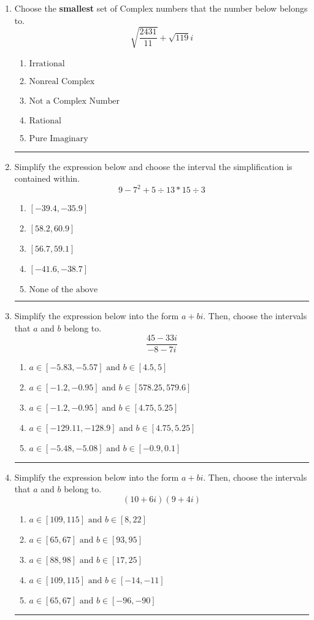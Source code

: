 \documentclass[14pt]{extbook}
\newcommand{\litem}[1]{\item#1\hspace*{-1cm}\rule{\textwidth}{0.4pt}}
\begin{document}
\begin{enumerate}
{\begin{enumerate}[label=\Alph*.]
\end{enumerate} }
\litem{
Choose the \textbf{smallest} set of Complex numbers that the number below belongs to.\[ \sqrt{\frac{2431}{11}}+\sqrt{119} i \]\begin{enumerate}[label=\Alph*.]
\item \( \text{Irrational} \)
\item \( \text{Nonreal Complex} \)
\item \( \text{Not a Complex Number} \)
\item \( \text{Rational} \)
\item \( \text{Pure Imaginary} \)

\end{enumerate} }
\litem{
Simplify the expression below and choose the interval the simplification is contained within.\[ 9 - 7^2 + 5 \div 13 * 15 \div 3 \]\begin{enumerate}[label=\Alph*.]
\item \( [-39.4, -35.9] \)
\item \( [58.2, 60.9] \)
\item \( [56.7, 59.1] \)
\item \( [-41.6, -38.7] \)
\item \( \text{None of the above} \)

\end{enumerate} }
\litem{
Simplify the expression below into the form $a+bi$. Then, choose the intervals that $a$ and $b$ belong to.\[ \frac{45 - 33 i}{-8 - 7 i} \]\begin{enumerate}[label=\Alph*.]
\item \( a \in [-5.83, -5.57] \text{ and } b \in [4.5, 5] \)
\item \( a \in [-1.2, -0.95] \text{ and } b \in [578.25, 579.6] \)
\item \( a \in [-1.2, -0.95] \text{ and } b \in [4.75, 5.25] \)
\item \( a \in [-129.11, -128.9] \text{ and } b \in [4.75, 5.25] \)
\item \( a \in [-5.48, -5.08] \text{ and } b \in [-0.9, 0.1] \)

\end{enumerate} }
\litem{
Simplify the expression below into the form $a+bi$. Then, choose the intervals that $a$ and $b$ belong to.\[ (10 + 6 i)(9 + 4 i) \]\begin{enumerate}[label=\Alph*.]
\item \( a \in [109, 115] \text{ and } b \in [8, 22] \)
\item \( a \in [65, 67] \text{ and } b \in [93, 95] \)
\item \( a \in [88, 98] \text{ and } b \in [17, 25] \)
\item \( a \in [109, 115] \text{ and } b \in [-14, -11] \)
\item \( a \in [65, 67] \text{ and } b \in [-96, -90] \)


\end{enumerate}}
\end{enumerate}
\end{document}
